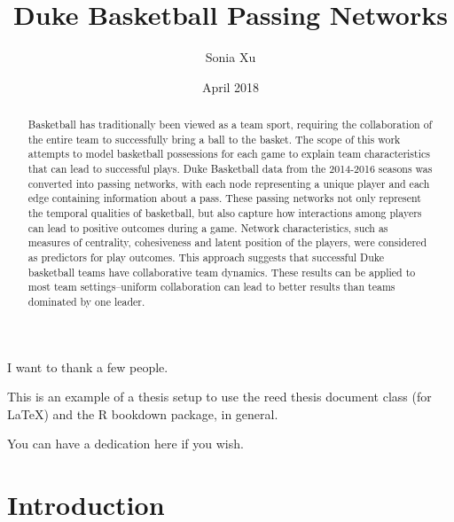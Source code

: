 \documentclass[12pt,twoside]{dukestatscithesis}
\title{Duke Basketball Passing Networks}
\author{Sonia Xu}
\date{April 2018}
\theoremstyle{definition}
\theoremstyle{definition}
\theoremstyle{definition}
\theoremstyle{remark}
\begin{document}
  \maketitle

\frontmatter %
\pagestyle{empty} %
  \begin{acknowledgements}
    I want to thank a few people.
  \end{acknowledgements}
  \begin{preface}
    This is an example of a thesis setup to use the reed thesis document
    class (for LaTeX) and the R bookdown package, in general.
  \end{preface}
  \hypersetup{linkcolor=black}
  \setcounter{tocdepth}{2}
  \tableofcontents

  \listoftables

  \listoffigures
  \begin{abstract}
    Basketball has traditionally been viewed as a team sport, requiring the
    collaboration of the entire team to successfully bring a ball to the
    basket. The scope of this work attempts to model basketball possessions
    for each game to explain team characteristics that can lead to
    successful plays. Duke Basketball data from the 2014-2016 seasons was
    converted into passing networks, with each node representing a unique
    player and each edge containing information about a pass. These passing
    networks not only represent the temporal qualities of basketball, but
    also capture how interactions among players can lead to positive
    outcomes during a game. Network characteristics, such as measures of
    centrality, cohesiveness and latent position of the players, were
    considered as predictors for play outcomes. This approach suggests that
    successful Duke basketball teams have collaborative team dynamics. These
    results can be applied to most team settings--uniform collaboration can
    lead to better results than teams dominated by one leader.
  \end{abstract}
  \begin{dedication}
    You can have a dedication here if you wish.
  \end{dedication}
\mainmatter %
\pagestyle{fancyplain} %

\chapter{Introduction}\label{introduction}
\end{document}
